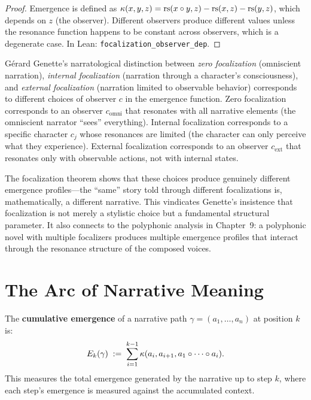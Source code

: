 \begin{proof}
Emergence is defined as $\kappa(x, y, z) = \mathrm{rs}(x \circ y, z) - \mathrm{rs}(x, z) - \mathrm{rs}(y, z)$, which depends on $z$ (the observer).  Different observers produce different values unless the resonance function happens to be constant across observers, which is a degenerate case.  In Lean: \texttt{focalization\_observer\_dep}.
\end{proof}

\begin{interpretation}
G\'erard Genette's narratological distinction between \emph{zero focalization} (omniscient narration), \emph{internal focalization} (narration through a character's consciousness), and \emph{external focalization} (narration limited to observable behavior) corresponds to different choices of observer $c$ in the emergence function.  Zero focalization corresponds to an observer $c_{\text{omni}}$ that resonates with all narrative elements (the omniscient narrator ``sees'' everything).  Internal focalization corresponds to a specific character $c_j$ whose resonances are limited (the character can only perceive what they experience).  External focalization corresponds to an observer $c_{\text{ext}}$ that resonates only with observable actions, not with internal states.

The focalization theorem shows that these choices produce genuinely different emergence profiles---the ``same'' story told through different focalizations is, mathematically, a different narrative.  This vindicates Genette's insistence that focalization is not merely a stylistic choice but a fundamental structural parameter.  It also connects to the polyphonic analysis in Chapter~9: a polyphonic novel with multiple focalizers produces multiple emergence profiles that interact through the resonance structure of the composed voices.
\end{interpretation}


\section{The Arc of Narrative Meaning}

\begin{definition}
\label{def:cumulative-emergence}
The \textbf{cumulative emergence} of a narrative path $\gamma = (a_1, \ldots, a_n)$
at position $k$ is:
\[
  E_k(\gamma) \;:=\; \sum_{i=1}^{k-1} \kappa(a_i, a_{i+1}, a_1 \circ
  \cdots \circ a_i).
\]
This measures the total emergence generated by the narrative up to step $k$,
where each step's emergence is measured against the accumulated context.
\end{definition}

